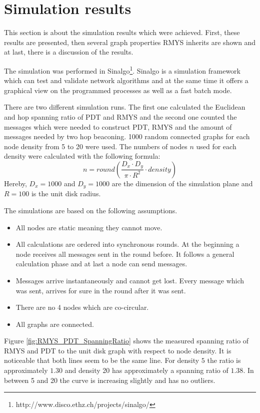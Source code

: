 \section{Simulation results}
This section is about the simulation results which were achieved.
First, these results are presented, then several graph properties RMYS inherits are shown and at last, there is a discussion of the results.

The simulation was performed in Sinalgo\footnote{http://www.disco.ethz.ch/projects/sinalgo/}.
Sinalgo is a simulation framework which can test and validate network algorithms and at the same time it offers a graphical view on the programmed processes as well as a fast batch mode.

There are two different simulation runs.
The first one calculated the Euclidean and hop spanning ratio of PDT and RMYS and the second one counted the messages which were needed to construct PDT, RMYS and the amount of messages needed by two hop beaconing.
1000 random connected graphs for each node density from 5 to 20 were used.
The numbers of nodes $n $ used for each density were calculated with the following formula:
\begin{equation*}
n =round( \frac{D_x \cdot D_y}{\pi \cdot R^2} \cdot density)
\end{equation*}
Hereby, $D_x=1000 $ and $D_y=1000 $ are the dimension of the simulation plane and $R = 100 $ is the unit disk radius.

\bigskip

The simulations are based on the following assumptions.
\begin{itemize}
\item All nodes are static meaning they cannot move.
\item All calculations are ordered into synchronous rounds. 
At the beginning a node receives all messages sent in the round before.
It follows a general calculation phase and at last a node can send messages.
\item Messages arrive instantaneously and cannot get lost.
Every message which was sent, arrives for sure in the round after it was sent.
\item There are no 4 nodes which are co-circular.
\item All graphs are connected.
\end{itemize}

Figure \ref{fig:RMYS_PDT_SpanningRatio} shows the measured spanning ratio of RMYS and PDT to the unit disk graph with respect to node density.
It is noticeable that both lines seem to be the same line.
For density $5 $ the ratio is approximately $1.30 $ and density 20 has approximately a spanning ratio of $1.38 $.
In between 5 and 20 the curve is increasing slightly and has no outliers.

